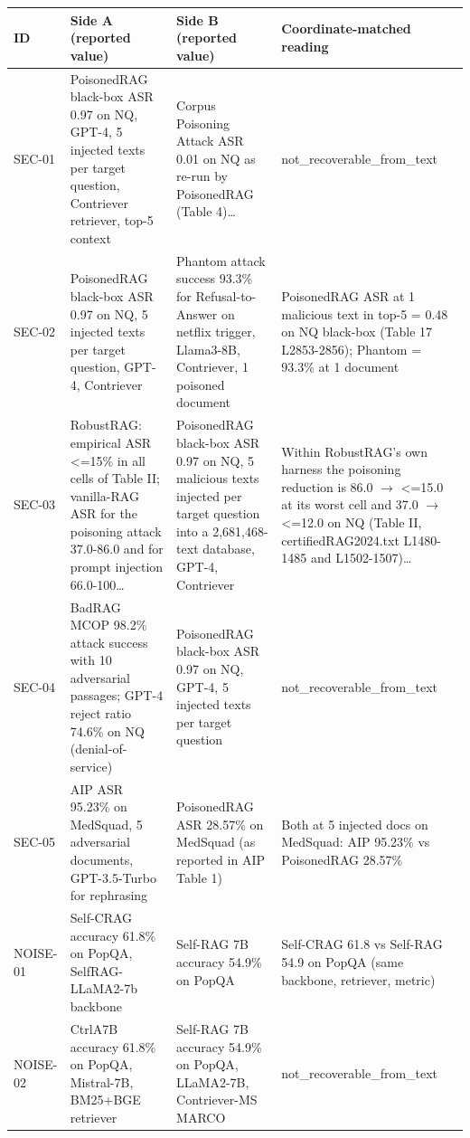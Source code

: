 \begin{table}[t]
\centering\scriptsize
\setlength{\tabcolsep}{3pt}
\begin{tabular}{@{}p{}p{}p{}p{}@{}}
\toprule
ID & Side A (reported value) & Side B (reported value) & Coordinate-matched reading \\
\midrule
SEC-01 & PoisonedRAG black-box ASR 0.97 on NQ, GPT-4, 5 injected texts per target question, Contriever retriever, top-5 context & Corpus Poisoning Attack ASR 0.01 on NQ as re-run by PoisonedRAG (Table 4)… & not\_recoverable\_from\_text \\
\addlinespace[1pt]
SEC-02 & PoisonedRAG black-box ASR 0.97 on NQ, 5 injected texts per target question, GPT-4, Contriever & Phantom attack success 93.3\% for Refusal-to-Answer on netflix trigger, Llama3-8B, Contriever, 1 poisoned document & PoisonedRAG ASR at 1 malicious text in top-5 = 0.48 on NQ black-box (Table 17 L2853-2856); Phantom = 93.3\% at 1 document \\
\addlinespace[1pt]
SEC-03 & RobustRAG: empirical ASR <=15\% in all cells of Table II; vanilla-RAG ASR for the poisoning attack 37.0-86.0 and for prompt injection 66.0-100… & PoisonedRAG black-box ASR 0.97 on NQ, 5 malicious texts injected per target question into a 2,681,468-text database, GPT-4, Contriever & Within RobustRAG's own harness the poisoning reduction is 86.0 $\rightarrow$ <=15.0 at its worst cell and 37.0 $\rightarrow$ <=12.0 on NQ (Table II, certifiedRAG2024.txt L1480-1485 and L1502-1507)… \\
\addlinespace[1pt]
SEC-04 & BadRAG MCOP 98.2\% attack success with 10 adversarial passages; GPT-4 reject ratio 74.6\% on NQ (denial-of-service) & PoisonedRAG black-box ASR 0.97 on NQ, GPT-4, 5 injected texts per target question & not\_recoverable\_from\_text \\
\addlinespace[1pt]
SEC-05 & AIP ASR 95.23\% on MedSquad, 5 adversarial documents, GPT-3.5-Turbo for rephrasing & PoisonedRAG ASR 28.57\% on MedSquad (as reported in AIP Table 1) & Both at 5 injected docs on MedSquad: AIP 95.23\% vs PoisonedRAG 28.57\% \\
\addlinespace[1pt]
NOISE-01 & Self-CRAG accuracy 61.8\% on PopQA, SelfRAG-LLaMA2-7b backbone & Self-RAG 7B accuracy 54.9\% on PopQA & Self-CRAG 61.8 vs Self-RAG 54.9 on PopQA (same backbone, retriever, metric) \\
\addlinespace[1pt]
NOISE-02 & CtrlA7B accuracy 61.8\% on PopQA, Mistral-7B, BM25+BGE retriever & Self-RAG 7B accuracy 54.9\% on PopQA, LLaMA2-7B, Contriever-MS MARCO & not\_recoverable\_from\_text \\

\end{tabular}
\end{table}
